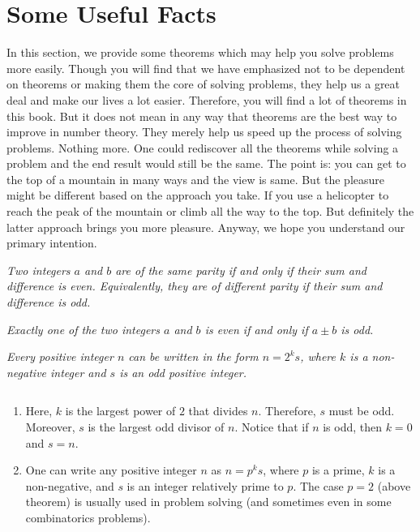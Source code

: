 \documentclass{subfile}
\begin{document}
	\section{Some Useful Facts}\label{sec:theoremsindiv}
	In this section, we provide some theorems which may help you solve problems more easily. Though you will find that we have emphasized not to be dependent on theorems or making them the core of solving problems, they help us a great deal and make our lives a lot easier. Therefore, you will find a lot of theorems in this book. But it does not mean in any way that theorems are the best way to improve in number theory. They merely help us speed up the process of solving problems. Nothing more. One could rediscover all the theorems while solving a problem and the end result would still be the same. The point is: you can get to the top of a mountain in many ways and the view is same. But the pleasure might be different based on the approach you take. If you use a helicopter to reach the peak of the mountain or climb all the way to the top. But definitely the latter approach brings you more pleasure. Anyway, we hope you understand our primary intention.

	\begin{theorem}\slshape
		Two integers $a$ and $b$ are of the same parity if and only if their sum and difference is even. Equivalently, they are of different parity if their sum and difference is odd.
	\end{theorem}

	\begin{corollary}\slshape\label{cor:sumparity}
		Exactly one of the two integers $a$ and $b$ is even if and only if $a\pm b$ is odd.
	\end{corollary}

	\begin{theorem}\slshape\label{thm:factorizeintopowersoftwo}
		Every positive integer $n$ can be written in the form $n=2^ks$, where $k$ is a non-negative integer and $s$ is an odd positive integer.
	\end{theorem}

	\begin{note}
		$ $
		\begin{enumerate}
			\item Here, $k$ is the largest power of $2$ that divides $n$. Therefore, $s$ must be odd. Moreover, $s$ is the largest odd divisor of $n$. Notice that if $n$ is odd, then $k=0$ and $s=n$.
			\item  One can write any positive integer $n$ as $n=p^ks$, where $p$ is a prime, $k$ is a non-negative, and $s$ is an integer relatively prime to $p$. The case $p=2$ (above theorem) is usually used in problem solving (and sometimes even in some combinatorics problems).
		\end{enumerate}
	\end{note}
\end{document}
